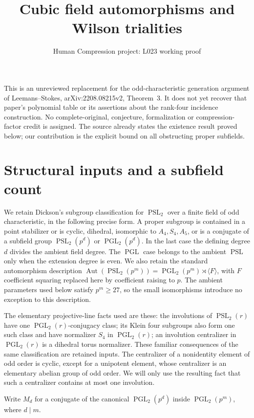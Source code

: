 \documentclass[11pt,a4paper]{article}
\title{Cubic field automorphisms and Wilson trialities}
\author{Human Compression project: L023 working proof}
\date{}
\newcommand{\PSL}{\operatorname{PSL}}
\newcommand{\PGL}{\operatorname{PGL}}
\newcommand{\Aut}{\operatorname{Aut}}
\newcommand{\gen}[1]{\langle#1\rangle}
\begin{document}
\maketitle

This is an unreviewed replacement for the odd-characteristic generation
argument of Leemans--Stokes, arXiv:2208.08215v2, Theorem~3.
It does not yet recover that paper's polynomial table or its assertions
about the rank-four incidence construction. No complete-original,
conjecture, formalization or compression-factor credit is assigned.
The source already states the existence result proved below; our
contribution is the explicit bound on all obstructing proper subfields.

\section{Structural inputs and a subfield count}

We retain Dickson's subgroup classification for $\PSL_2$ over a finite
field of odd characteristic, in the following precise form. A proper
subgroup is contained in a point stabilizer or is cyclic, dihedral,
isomorphic to $A_4,S_4,A_5$, or is a conjugate of a subfield group
$\PSL_2(p^d)$ or $\PGL_2(p^d)$. In the last case the defining degree
$d$ divides the ambient field degree. The $\PGL$ case belongs to
the ambient $\PSL$ only when the extension degree is even.
We also retain the standard automorphism description
$\Aut(\PSL_2(p^m))=\PGL_2(p^m)\rtimes\gen F$, with $F$ coefficient
squaring replaced here by coefficient raising to $p$.
The ambient parameters used below satisfy $p^m\geq27$, so the small
isomorphisms introduce no exception to this description.

The elementary projective-line facts used are these: the involutions
of $\PSL_2(r)$ have one $\PGL_2(r)$-conjugacy class; its Klein four
subgroups also form one such class and have normalizer $S_4$ in
$\PGL_2(r)$; an involution centralizer in $\PGL_2(r)$ is a dihedral
torus normalizer. These familiar consequences of the same classification
are retained inputs. The centralizer of a nonidentity element of odd
order is cyclic, except for a unipotent element, whose centralizer is
an elementary abelian group of odd order. We will only use the resulting
fact that such a centralizer contains at most one involution.

Write $M_d$ for a conjugate of the canonical $\PGL_2(p^d)$ inside
$\PGL_2(p^m)$, where $d\mid m$.
\end{document}
